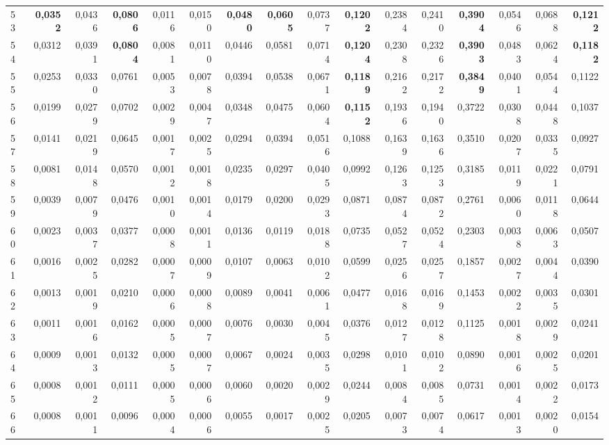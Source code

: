 \begin{table}[htp!]
\begin{adjustwidth}{-2cm}{}
\begin{tabular}{ l | *{15}{| r}}
53	&	\textbf{0,0352}	&	0,0436	&	\textbf{0,0806}	&	0,0116	&	0,0150	&	\textbf{0,0480}	&	\textbf{0,0605}	&	0,0737	&	\textbf{0,1202}	&	0,2384	&	0,2410	&	\textbf{0,3904}	&	0,0546	&	0,0688	&	\textbf{0,1212}	\\
54	&	0,0312	&	0,0391	&	\textbf{0,0804}	&	0,0081	&	0,0110	&	0,0446	&	0,0581	&	0,0714	&	\textbf{0,1204}	&	0,2308	&	0,2326	&	\textbf{0,3903}	&	0,0483	&	0,0624	&	\textbf{0,1182}	\\
55	&	0,0253	&	0,0330	&	0,0761	&	0,0053	&	0,0078	&	0,0394	&	0,0538	&	0,0671	&	\textbf{0,1189}	&	0,2162	&	0,2172	&	\textbf{0,3849}	&	0,0401	&	0,0544	&	0,1122	\\
56	&	0,0199	&	0,0279	&	0,0702	&	0,0029	&	0,0047	&	0,0348	&	0,0475	&	0,0604	&	\textbf{0,1152}	&	0,1936	&	0,1940	&	0,3722	&	0,0308	&	0,0448	&	0,1037	\\
57	&	0,0141	&	0,0219	&	0,0645	&	0,0017	&	0,0025	&	0,0294	&	0,0394	&	0,0516	&	0,1088	&	0,1639	&	0,1636	&	0,3510	&	0,0207	&	0,0335	&	0,0927	\\
58	&	0,0081	&	0,0148	&	0,0570	&	0,0012	&	0,0018	&	0,0235	&	0,0297	&	0,0405	&	0,0992	&	0,1263	&	0,1253	&	0,3185	&	0,0119	&	0,0221	&	0,0791	\\
59	&	0,0039	&	0,0079	&	0,0476	&	0,0010	&	0,0014	&	0,0179	&	0,0200	&	0,0293	&	0,0871	&	0,0874	&	0,0872	&	0,2761	&	0,0060	&	0,0118	&	0,0644	\\
60	&	0,0023	&	0,0037	&	0,0377	&	0,0008	&	0,0011	&	0,0136	&	0,0119	&	0,0188	&	0,0735	&	0,0527	&	0,0524	&	0,2303	&	0,0038	&	0,0063	&	0,0507	\\
61	&	0,0016	&	0,0025	&	0,0282	&	0,0007	&	0,0009	&	0,0107	&	0,0063	&	0,0102	&	0,0599	&	0,0256	&	0,0257	&	0,1857	&	0,0027	&	0,0044	&	0,0390	\\
62	&	0,0013	&	0,0019	&	0,0210	&	0,0006	&	0,0008	&	0,0089	&	0,0041	&	0,0061	&	0,0477	&	0,0168	&	0,0169	&	0,1453	&	0,0022	&	0,0035	&	0,0301	\\
63	&	0,0011	&	0,0016	&	0,0162	&	0,0005	&	0,0007	&	0,0076	&	0,0030	&	0,0045	&	0,0376	&	0,0127	&	0,0128	&	0,1125	&	0,0018	&	0,0029	&	0,0241	\\
64	&	0,0009	&	0,0013	&	0,0132	&	0,0005	&	0,0007	&	0,0067	&	0,0024	&	0,0035	&	0,0298	&	0,0101	&	0,0102	&	0,0890	&	0,0016	&	0,0025	&	0,0201	\\
65	&	0,0008	&	0,0012	&	0,0111	&	0,0005	&	0,0006	&	0,0060	&	0,0020	&	0,0029	&	0,0244	&	0,0084	&	0,0085	&	0,0731	&	0,0014	&	0,0022	&	0,0173	\\
66	&	0,0008	&	0,0011	&	0,0096	&	0,0004	&	0,0006	&	0,0055	&	0,0017	&	0,0025	&	0,0205	&	0,0073	&	0,0074	&	0,0617	&	0,0013	&	0,0020	&	0,0154	\\

\end{tabular}
\end{adjustwidth}
\end{table}
